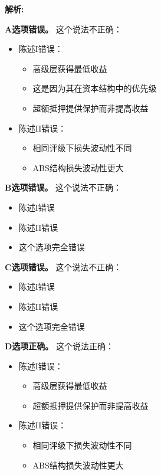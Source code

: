 \documentclass{article}
\newenvironment{explanation}
{\textbf{解析:}\par}
{\par}
\begin{document}
\begin{explanation}
    \textbf{A选项错误。}
    这个说法不正确：
    \begin{itemize}
        \item 陈述I错误：
        \begin{itemize}
            \item 高级层获得最低收益
            \item 这是因为其在资本结构中的优先级
            \item 超额抵押提供保护而非提高收益
        \end{itemize}
        \item 陈述II错误：
        \begin{itemize}
            \item 相同评级下损失波动性不同
            \item ABS结构损失波动性更大
        \end{itemize}
    \end{itemize}

    \textbf{B选项错误。}
    这个说法不正确：
    \begin{itemize}
        \item 陈述I错误
        \item 陈述II错误
        \item 这个选项完全错误
    \end{itemize}

    \textbf{C选项错误。}
    这个说法不正确：
    \begin{itemize}
        \item 陈述I错误
        \item 陈述II错误
        \item 这个选项完全错误
    \end{itemize}

    \textbf{D选项正确。}
    这个说法正确：
    \begin{itemize}
        \item 陈述I错误：
        \begin{itemize}
            \item 高级层获得最低收益
            \item 超额抵押提供保护而非提高收益
        \end{itemize}
        \item 陈述II错误：
        \begin{itemize}
            \item 相同评级下损失波动性不同
            \item ABS结构损失波动性更大
        \end{itemize}
    \end{itemize}
\end{explanation}
\end{document}
